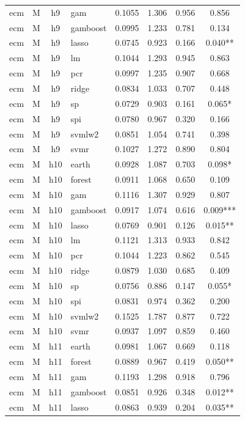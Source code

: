 \begin{ThreePartTable}
\begin{longtable}[t]{llclcccc}
ecm & M & h9 & gam & 0.1055 & 1.306 & 0.956 & 0.856\\
ecm & M & h9 & gamboost & 0.0995 & 1.233 & 0.781 & 0.134\\
ecm & M & h9 & lasso & 0.0745 & 0.923 & 0.166 & 0.040**\\
ecm & M & h9 & lm & 0.1044 & 1.293 & 0.945 & 0.863\\
ecm & M & h9 & pcr & 0.0997 & 1.235 & 0.907 & 0.668\\
ecm & M & h9 & ridge & 0.0834 & 1.033 & 0.707 & 0.448\\
ecm & M & h9 & sp & 0.0729 & 0.903 & 0.161 & 0.065*\\
ecm & M & h9 & spi & 0.0780 & 0.967 & 0.320 & 0.166\\
ecm & M & h9 & svmlw2 & 0.0851 & 1.054 & 0.741 & 0.398\\
ecm & M & h9 & svmr & 0.1027 & 1.272 & 0.890 & 0.804\\
\addlinespace
ecm & M & h10 & earth & 0.0928 & 1.087 & 0.703 & 0.098*\\
ecm & M & h10 & forest & 0.0911 & 1.068 & 0.650 & 0.109\\
ecm & M & h10 & gam & 0.1116 & 1.307 & 0.929 & 0.807\\
ecm & M & h10 & gamboost & 0.0917 & 1.074 & 0.616 & 0.009***\\
ecm & M & h10 & lasso & 0.0769 & 0.901 & 0.126 & 0.015**\\
ecm & M & h10 & lm & 0.1121 & 1.313 & 0.933 & 0.842\\
ecm & M & h10 & pcr & 0.1044 & 1.223 & 0.862 & 0.545\\
ecm & M & h10 & ridge & 0.0879 & 1.030 & 0.685 & 0.409\\
ecm & M & h10 & sp & 0.0756 & 0.886 & 0.147 & 0.055*\\
ecm & M & h10 & spi & 0.0831 & 0.974 & 0.362 & 0.200\\
ecm & M & h10 & svmlw2 & 0.1525 & 1.787 & 0.877 & 0.722\\
ecm & M & h10 & svmr & 0.0937 & 1.097 & 0.859 & 0.460\\
\addlinespace
ecm & M & h11 & earth & 0.0981 & 1.067 & 0.669 & 0.118\\
ecm & M & h11 & forest & 0.0889 & 0.967 & 0.419 & 0.050**\\
ecm & M & h11 & gam & 0.1193 & 1.298 & 0.918 & 0.796\\
ecm & M & h11 & gamboost & 0.0851 & 0.926 & 0.348 & 0.012**\\
ecm & M & h11 & lasso & 0.0863 & 0.939 & 0.204 & 0.035**\\

\end{longtable}
\end{ThreePartTable}
